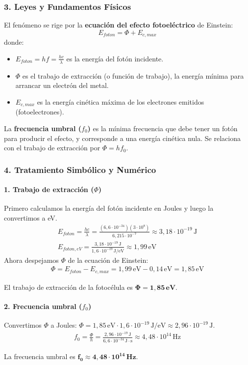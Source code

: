 \subsubsection*{3. Leyes y Fundamentos Físicos}
El fenómeno se rige por la \textbf{ecuación del efecto fotoeléctrico} de Einstein:
$$ E_{foton} = \Phi + E_{c,max} $$
donde:
\begin{itemize}
    \item $E_{foton} = hf = \frac{hc}{\lambda}$ es la energía del fotón incidente.
    \item $\Phi$ es el trabajo de extracción (o función de trabajo), la energía mínima para arrancar un electrón del metal.
    \item $E_{c,max}$ es la energía cinética máxima de los electrones emitidos (fotoelectrones).
\end{itemize}
La \textbf{frecuencia umbral ($f_0$)} es la mínima frecuencia que debe tener un fotón para producir el efecto, y corresponde a una energía cinética nula. Se relaciona con el trabajo de extracción por $\Phi = h f_0$.

\subsubsection*{4. Tratamiento Simbólico y Numérico}
\paragraph{1. Trabajo de extracción ($\Phi$)}
Primero calculamos la energía del fotón incidente en Joules y luego la convertimos a eV.
\begin{gather}
    E_{foton} = \frac{hc}{\lambda} = \frac{(6,6\cdot10^{-34})(3\cdot10^8)}{6,215\cdot10^{-7}} \approx 3,18 \cdot 10^{-19} \, \text{J} \\
    E_{foton, eV} = \frac{3,18 \cdot 10^{-19} \, \text{J}}{1,6\cdot10^{-19} \, \text{J/eV}} \approx 1,99 \, \text{eV}
\end{gather}
Ahora despejamos $\Phi$ de la ecuación de Einstein:
\begin{gather}
    \Phi = E_{foton} - E_{c,max} = 1,99 \, \text{eV} - 0,14 \, \text{eV} = 1,85 \, \text{eV}
\end{gather}
\begin{cajaresultado}
El trabajo de extracción de la fotocélula es $\boldsymbol{\Phi = 1,85 \, \textbf{eV}}$.
\end{cajaresultado}

\paragraph{2. Frecuencia umbral ($f_0$)}
Convertimos $\Phi$ a Joules: $\Phi = 1,85 \, \text{eV} \cdot 1,6\cdot10^{-19} \, \text{J/eV} \approx 2,96 \cdot 10^{-19} \, \text{J}$.
\begin{gather}
    f_0 = \frac{\Phi}{h} = \frac{2,96 \cdot 10^{-19} \, \text{J}}{6,6\cdot10^{-34} \, \text{J}\cdot\text{s}} \approx 4,48 \cdot 10^{14} \, \text{Hz}
\end{gather}
\begin{cajaresultado}
La frecuencia umbral es $\boldsymbol{f_0 \approx 4,48 \cdot 10^{14} \, \textbf{Hz}}$.
\end{cajaresultado}

